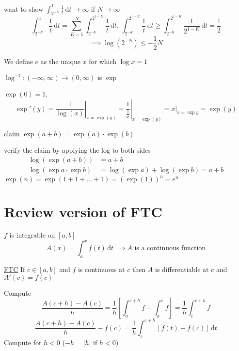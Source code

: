 want to show $\displaystyle\int_{2^{-N}}^1 \frac{1}{t}\,\mathrm{d}t \to \infty$ if $N \to \infty$
\[\int_{2^{-N}}^1 \frac{1}{t}\,\mathrm{d}t = \sum_{K=1}^{N} \int_{2^{-K}}^{2^{1-K}} \frac{1}{t}\,\mathrm{d}t,\, \int_{2^{-K}}^{2^{1-K}} \frac{1}{t}\,\mathrm{d}t \ge \int_{2^{-K}}^{2^{1-K}} \frac{1}{2^{1-K}}\,\mathrm{d}t = \frac{1}{2}\]
\[ \implies \log(2^{-N}) \le -\frac{1}{2}N\]

We define $e$ as the unique $x$ for which $\log x = 1$

\begin{center}
\end{center}

$\log^{-1}:(-\infty, \infty) \to (0, \infty)$ is $\exp$

$\exp(0) = 1$, 
$$\exp'(y) = \left.\frac{1}{\log(x)}\right|_{x=\exp(y)} = \left.\frac{1}{\frac{1}{x}}\right|_{x=\exp(y)}=\left.x\right|_{x=\exp{y}} = \exp(y)$$


\underline{claim}
$\exp(a+b) = \exp(a)\cdot\exp(b)$

verify the claim by applying the log to both sides
\begin{align*}
  \log(\exp(a+b)) &= a + b\\
  \log(\exp a \cdot \exp b) &= \log(\exp a) + \log(\exp b) = a + b
\end{align*}
$\exp(n) = \exp(1 + 1 + \dotsc + 1) = (\exp(1))^n = e^n$

\section{Review version of FTC}

$f$ is integrable on $[a, b]$
\[A(x) = \int_a^x f(t)\,\mathrm{d}t \implies A \text{ is a continuous function}\]

\underline{FTC} If $c \in [a, b]$ and $f$ is continuous at $c$ then $A$ is differentiable at $c$ and $A'(c) = f(c)$

Compute
\[\frac{A(c+h) - A(c)}{h} = \frac{1}{h}\left[\int_a^{c+h}f - \int_a^c f\right] = \frac{1}{h}\int_c^{c+h}f \]
\[\frac{A(c+h) - A(c)}{h} - f(c) = \frac{1}{h}\int_c^{c+h}\left[f(t) - f(c)\right]\,\mathrm{d}t\]
Compute for $h < 0$ ($-h = |h|$ if $h < 0$)

